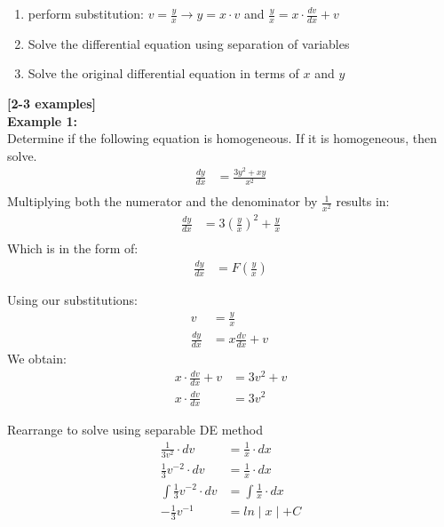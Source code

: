 \documentclass{article}
\begin{document}
\begin{flushleft}
{\begin{enumerate}
\item perform substitution: $ v = \frac{y}{x} \rightarrow y = x \cdot v$ and $\frac{y}{x} = x \cdot \frac{dv}{dx} + v $
\item Solve the differential equation using separation of variables
\item Solve the original differential equation in terms of $x$ and $y$
\end{enumerate}

\textbf{[2-3 examples]}\\
\textbf{Example 1:}\\
Determine if the following equation is homogeneous. If it is homogeneous, then solve.
\begin{align*}
\frac{dy}{dx} & = \frac{3y^2 +xy}{x^2}\\
\end{align*}
Multiplying both the numerator and the denominator by $\frac{1}{x^2}$ results in:\\
\begin{align*}
\frac{dy}{dx} & = 3(\frac{y}{x})^2+\frac{y}{x}\\
\end{align*}
Which is in the form of:
\begin{align*}
\frac{dy}{dx} & = F (\frac{y}{x})
\end{align*}

Using our substitutions:\\
\begin{align*}
v & = \frac{y}{x}\\
\frac{dy}{dx} & = x \frac{dv}{dx} + v\
 \end{align*}
We obtain:\\
\begin{align*}
x \cdot \frac{dv}{dx} + v & = 3v^2 + v\\
x \cdot  \frac{dv}{dx}  & = 3v^2 
\end{align*}

Rearrange to solve using separable DE method\\
\begin{align*}
\frac{1}{3v^2} \cdot dv & = \frac{1}{x} \cdot dx \\
\frac{1}{3} v^{-2} \cdot dv & = \frac{1}{x} \cdot dx \\
\int \frac{1}{3} v^{-2} \cdot dv & = \int \frac{1}{x} \cdot dx  \\
-\frac{1}{3}v^{-1} & = ln\mid x \mid + C
\end{align*}

}
\end{flushleft}
\end{document}
